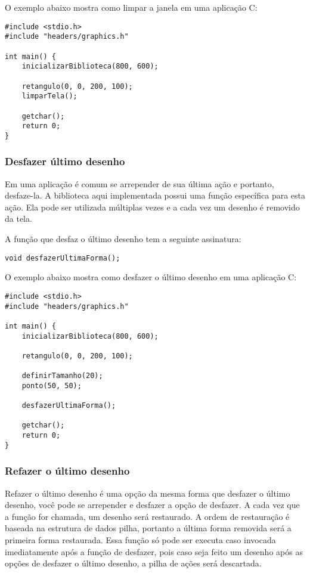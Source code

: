 \documentclass[12pt, %
openright,
oneside, %
a4paper,    %
brazil]{facom-ufu-abntex2}
\begin{document}
O exemplo abaixo mostra como limpar a janela em uma aplicação C:

\begin{lstlisting}
#include <stdio.h>
#include "headers/graphics.h"

int main() {
    inicializarBiblioteca(800, 600);

    retangulo(0, 0, 200, 100);
    limparTela();

    getchar();
    return 0;
}
\end{lstlisting}

\subsubsection{Desfazer último desenho}
Em uma aplicação é comum se arrepender de sua última ação e portanto, desfaze-la. A biblioteca aqui implementada possui uma função específica para esta ação. Ela pode ser utilizada múltiplas vezes e a cada vez um desenho é removido da tela.

A função que desfaz o último desenho tem a seguinte assinatura:

\begin{lstlisting}
void desfazerUltimaForma();
\end{lstlisting}

O exemplo abaixo mostra como desfazer o último desenho em uma aplicação C:

\begin{lstlisting}
#include <stdio.h>
#include "headers/graphics.h"

int main() {
    inicializarBiblioteca(800, 600);

    retangulo(0, 0, 200, 100);
    
    definirTamanho(20);
    ponto(50, 50);
    
    desfazerUltimaForma();

    getchar();
    return 0;
}
\end{lstlisting}

\subsubsection{Refazer o último desenho}
Refazer o último desenho é uma opção da mesma forma que desfazer o último desenho, você pode se arrepender e desfazer a opção de desfazer. A cada vez que a função for chamada, um desenho será restaurado. A ordem de restauração é baseada na estrutura de dados pilha, portanto a última forma removida será a primeira forma restaurada. Essa função só pode ser executa caso invocada imediatamente após a função de desfazer, pois caso seja feito um desenho após as opções de desfazer o último desenho, a pilha de ações será descartada.
\end{document}
